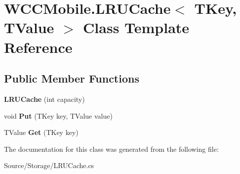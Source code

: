 \hypertarget{class_w_c_c_mobile_1_1_l_r_u_cache}{}\section{W\+C\+C\+Mobile.\+L\+R\+U\+Cache$<$ T\+Key, T\+Value $>$ Class Template Reference}
\label{class_w_c_c_mobile_1_1_l_r_u_cache}
\subsection*{Public Member Functions}
\begin{DoxyCompactItemize}
\item 
{\bfseries L\+R\+U\+Cache} (int capacity)\hypertarget{class_w_c_c_mobile_1_1_l_r_u_cache_a3dbc0f5ae542b6def7914f7edcfd943d}{}\label{class_w_c_c_mobile_1_1_l_r_u_cache_a3dbc0f5ae542b6def7914f7edcfd943d}

\item 
void {\bfseries Put} (T\+Key key, T\+Value value)\hypertarget{class_w_c_c_mobile_1_1_l_r_u_cache_a596c1634fd7f0359e87ed983b77a1dfc}{}\label{class_w_c_c_mobile_1_1_l_r_u_cache_a596c1634fd7f0359e87ed983b77a1dfc}

\item 
T\+Value {\bfseries Get} (T\+Key key)\hypertarget{class_w_c_c_mobile_1_1_l_r_u_cache_aeb62fa6c77765944733cd3cc2c94cd33}{}\label{class_w_c_c_mobile_1_1_l_r_u_cache_aeb62fa6c77765944733cd3cc2c94cd33}

\end{DoxyCompactItemize}


The documentation for this class was generated from the following file\+:\begin{DoxyCompactItemize}
\item 
Source/\+Storage/L\+R\+U\+Cache.\+cs\end{DoxyCompactItemize}
